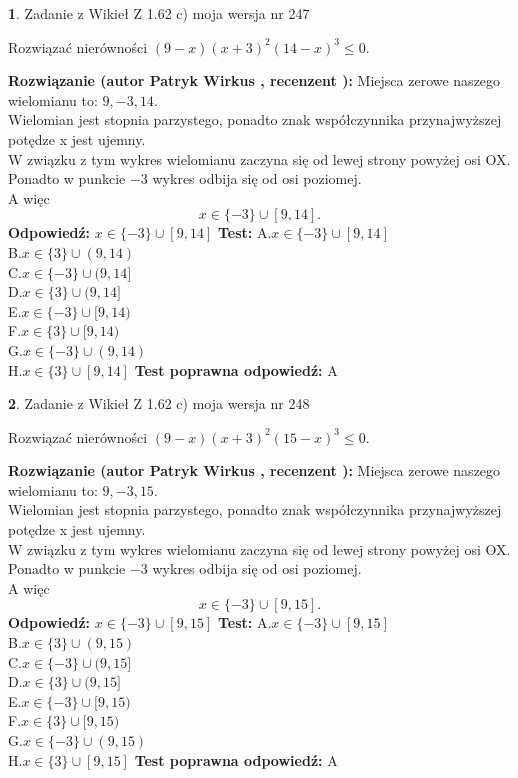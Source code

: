 \documentclass[12pt, a4paper]{article}
\theoremstyle{definition} %
\newtheorem{zad}{}
\newcommand{\zadStart}[1]{\begin{zad}#1\newline}
\newcommand{\zadStop}{\end{zad}}
\newcommand{\rozwStart}[2]{\noindent \textbf{Rozwiązanie (autor #1 , recenzent #2): }\newline}
\newcommand{\rozwStop}{\newline}
\newcommand{\odpStart}{\noindent \textbf{Odpowiedź:}\newline}
\newcommand{\odpStop}{\newline}
\newcommand{\testStart}{\noindent \textbf{Test:}\newline}
\newcommand{\testStop}{\newline}
\newcommand{\kluczStart}{\noindent \textbf{Test poprawna odpowiedź:}\newline}
\newcommand{\kluczStop}{\newline}
\begin{document}
\zadStart{Zadanie z Wikieł Z 1.62 c) moja wersja nr 247}

Rozwiązać nierówności $(9-x)(x+3)^{2}(14-x)^{3}\le0$.
\zadStop
\rozwStart{Patryk Wirkus}{}
Miejsca zerowe naszego wielomianu to: $9, -3, 14$.\\
Wielomian jest stopnia parzystego, ponadto znak współczynnika przy\linebreak najwyższej potędze x jest ujemny.\\ W związku z tym wykres wielomianu zaczyna się od lewej strony powyżej osi OX.\\
Ponadto w punkcie $-3$ wykres odbija się od osi poziomej.\\
A więc $$x \in \{-3\} \cup [9,14].$$
\rozwStop
\odpStart
$x \in \{-3\} \cup [9,14]$
\odpStop
\testStart
A.$x \in \{-3\} \cup [9,14]$\\
B.$x \in \{3\} \cup (9,14)$\\
C.$x \in \{-3\} \cup (9,14]$\\
D.$x \in \{3\} \cup (9,14]$\\
E.$x \in \{-3\} \cup [9,14)$\\
F.$x \in \{3\} \cup [9,14)$\\
G.$x \in \{-3\} \cup (9,14)$\\
H.$x \in \{3\} \cup [9,14]$
\testStop
\kluczStart
A
\kluczStop



\zadStart{Zadanie z Wikieł Z 1.62 c) moja wersja nr 248}

Rozwiązać nierówności $(9-x)(x+3)^{2}(15-x)^{3}\le0$.
\zadStop
\rozwStart{Patryk Wirkus}{}
Miejsca zerowe naszego wielomianu to: $9, -3, 15$.\\
Wielomian jest stopnia parzystego, ponadto znak współczynnika przy\linebreak najwyższej potędze x jest ujemny.\\ W związku z tym wykres wielomianu zaczyna się od lewej strony powyżej osi OX.\\
Ponadto w punkcie $-3$ wykres odbija się od osi poziomej.\\
A więc $$x \in \{-3\} \cup [9,15].$$
\rozwStop
\odpStart
$x \in \{-3\} \cup [9,15]$
\odpStop
\testStart
A.$x \in \{-3\} \cup [9,15]$\\
B.$x \in \{3\} \cup (9,15)$\\
C.$x \in \{-3\} \cup (9,15]$\\
D.$x \in \{3\} \cup (9,15]$\\
E.$x \in \{-3\} \cup [9,15)$\\
F.$x \in \{3\} \cup [9,15)$\\
G.$x \in \{-3\} \cup (9,15)$\\
H.$x \in \{3\} \cup [9,15]$
\testStop
\kluczStart
A
\kluczStop
\end{document}
